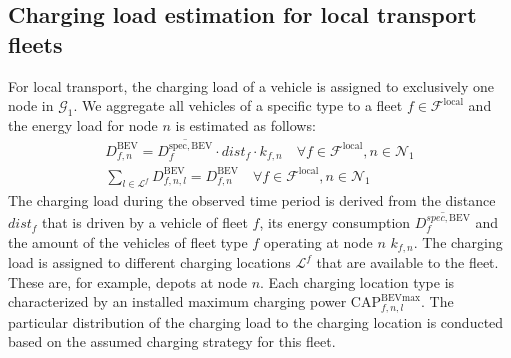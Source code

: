        \subsection{Charging load estimation for local transport fleets}
        For local transport, the charging load of a vehicle is assigned to exclusively one node in $\mathcal{G}_1$. We aggregate all vehicles of a specific type to a fleet $f \in \mathcal{F}^{\mathrm{local}}$ and the energy load for node $n$ is estimated as follows:
                \begin{align}
                    D^{\mathrm{BEV}}_{f,n} = \overline{D^{\mathrm{spec,BEV}}_{f}} \cdot dist_{f}  \cdot k_{f,n} \quad \forall f \in \mathcal{F}^{\mathrm{local}}, n \in \mathcal{N}_1 \\
                    \sum_{l \in \mathcal{L}^f} D^{\mathrm{BEV}}_{f,n,l} = D^{\mathrm{BEV}}_{f,n}  \quad \forall f \in \mathcal{F}^{\mathrm{local}}, n \in \mathcal{N}_1
                \end{align}
                The charging load during the observed time period is derived from the distance $dist_f$ that is driven by a vehicle of fleet $f$, its energy consumption $\overline{D^{spec,\mathrm{BEV}}_{f}}$ and the amount of the vehicles of fleet type $f$ operating at node $n$ $k_{f,n}$. The charging load is assigned to different charging locations $\mathcal{L}^f$ that are available to the fleet. These are, for example, depots at node $n$. Each charging location type is characterized by an installed maximum charging power $\mathrm{CAP}^{\mathrm{BEV max}}_{f, n, l}$. The particular distribution of the charging load to the charging location is conducted based on the assumed charging strategy for this fleet. 
